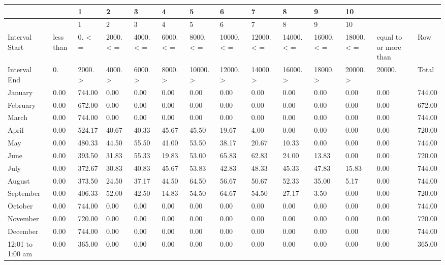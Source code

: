 {\tiny
\begin{longtable}[c]{>{\raggedright}p{0.42in}>{\raggedright}p{0.42in}>{\raggedright}p{0.42in}>{\raggedright}p{0.42in}>{\raggedright}p{0.42in}>{\raggedright}p{0.42in}>{\raggedright}p{0.42in}>{\raggedright}p{0.42in}>{\raggedright}p{0.42in}>{\raggedright}p{0.42in}>{\raggedright}p{0.42in}>{\raggedright}p{0.42in}>{\raggedright}p{0.42in}>{\raggedright}p{0.42in}}
\toprule 
~ & ~ & 1 & 2 & 3 & 4 & 5 & 6 & 7 & 8 & 9 & 10 & ~ & ~ \tabularnewline
\midrule
\endfirsthead

\toprule 
~ & ~ & 1 & 2 & 3 & 4 & 5 & 6 & 7 & 8 & 9 & 10 & ~ & ~ \tabularnewline
\midrule
\endhead

Interval Start & less than & 0. < = & 2000. < = & 4000. < = & 6000. < = & 8000. < = & 10000. < = & 12000. < = & 14000. < = & 16000. < = & 18000. < = & equal to or more than & Row \tabularnewline
Interval End & 0. & 2000. > & 4000. > & 6000. > & 8000. > & 10000. > & 12000. > & 14000. > & 16000. > & 18000. > & 20000. > & 20000. & Total \tabularnewline
January & 0.00 & 744.00 & 0.00 & 0.00 & 0.00 & 0.00 & 0.00 & 0.00 & 0.00 & 0.00 & 0.00 & 0.00 & 744.00 \tabularnewline
February & 0.00 & 672.00 & 0.00 & 0.00 & 0.00 & 0.00 & 0.00 & 0.00 & 0.00 & 0.00 & 0.00 & 0.00 & 672.00 \tabularnewline
March & 0.00 & 744.00 & 0.00 & 0.00 & 0.00 & 0.00 & 0.00 & 0.00 & 0.00 & 0.00 & 0.00 & 0.00 & 744.00 \tabularnewline
April & 0.00 & 524.17 & 40.67 & 40.33 & 45.67 & 45.50 & 19.67 & 4.00 & 0.00 & 0.00 & 0.00 & 0.00 & 720.00 \tabularnewline
May & 0.00 & 480.33 & 44.50 & 55.50 & 41.00 & 53.50 & 38.17 & 20.67 & 10.33 & 0.00 & 0.00 & 0.00 & 744.00 \tabularnewline
June & 0.00 & 393.50 & 31.83 & 55.33 & 19.83 & 53.00 & 65.83 & 62.83 & 24.00 & 13.83 & 0.00 & 0.00 & 720.00 \tabularnewline
July & 0.00 & 372.67 & 30.83 & 40.83 & 45.67 & 53.83 & 42.83 & 48.33 & 45.33 & 47.83 & 15.83 & 0.00 & 744.00 \tabularnewline
August & 0.00 & 373.50 & 24.50 & 37.17 & 44.50 & 64.50 & 56.67 & 50.67 & 52.33 & 35.00 & 5.17 & 0.00 & 744.00 \tabularnewline
September & 0.00 & 406.33 & 52.00 & 42.50 & 14.83 & 54.50 & 64.67 & 54.50 & 27.17 & 3.50 & 0.00 & 0.00 & 720.00 \tabularnewline
October & 0.00 & 744.00 & 0.00 & 0.00 & 0.00 & 0.00 & 0.00 & 0.00 & 0.00 & 0.00 & 0.00 & 0.00 & 744.00 \tabularnewline
November & 0.00 & 720.00 & 0.00 & 0.00 & 0.00 & 0.00 & 0.00 & 0.00 & 0.00 & 0.00 & 0.00 & 0.00 & 720.00 \tabularnewline
December & 0.00 & 744.00 & 0.00 & 0.00 & 0.00 & 0.00 & 0.00 & 0.00 & 0.00 & 0.00 & 0.00 & 0.00 & 744.00 \tabularnewline
12:01 to 1:00 am & 0.00 & 365.00 & 0.00 & 0.00 & 0.00 & 0.00 & 0.00 & 0.00 & 0.00 & 0.00 & 0.00 & 0.00 & 365.00 \tabularnewline

\end{longtable}}
